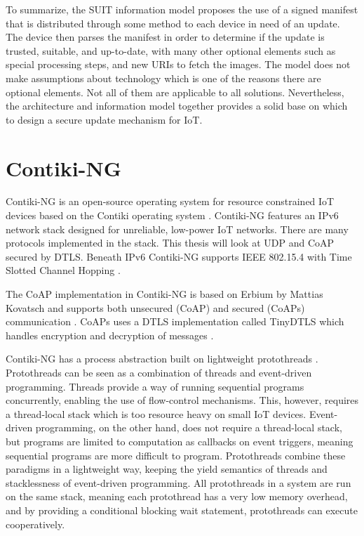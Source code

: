 \documentclass[0-thesis.tex]{subfiles}
\begin{document}
To summarize, the SUIT information model proposes the use of a signed manifest that is
distributed through some method to each device in need of an update. The device then
parses the manifest in order to determine if the update is trusted, suitable, and
up-to-date, with many other optional elements such as special processing steps, and new
URIs to fetch the images. The model does not make assumptions about technology which is
one of the reasons there are optional elements. Not all of them are applicable to all
solutions. Nevertheless, the architecture and information model together provides a solid
base on which to design a secure update mechanism for IoT.

\section{Contiki-NG}
\label{sec:contiki-ng}
Contiki-NG is an open-source operating system for resource constrained IoT devices based
on the Contiki operating system \parencite{contiki-ng-github, contiki-github}. Contiki-NG
features an IPv6 network stack designed for unreliable, low-power IoT networks. There are
many protocols implemented in the stack. This thesis will look at UDP and CoAP secured by
DTLS. Beneath IPv6 Contiki-NG supports IEEE 802.15.4 with Time Slotted Channel Hopping
\parencite{ieee-802.15.4}.

The CoAP implementation in Contiki-NG is based on Erbium by Mattias Kovatsch and supports
both unsecured (CoAP) and secured (CoAPs) communication \parencite{low-power-coap}. CoAPs
uses a DTLS implementation called TinyDTLS which handles encryption and decryption of
messages \parencite{tinydtls-github}.

Contiki-NG has a process abstraction built on lightweight protothreads
\parencite{protothreads}. Protothreads can be seen as a combination of threads and
event-driven programming. Threads provide a way of running sequential programs
concurrently, enabling the use of flow-control mechanisms. This, however, requires a
thread-local stack which is too resource heavy on small IoT devices. Event-driven
programming, on the other hand, does not require a thread-local stack, but programs are
limited to computation as callbacks on event triggers, meaning sequential programs are
more difficult to program. Protothreads combine these paradigms in a lightweight way,
keeping the yield semantics of threads and stacklessness of event-driven programming. All
protothreads in a system are run on the same stack, meaning each protothread has a very
low memory overhead, and by providing a conditional blocking wait statement, protothreads
can execute cooperatively.
\end{document}

